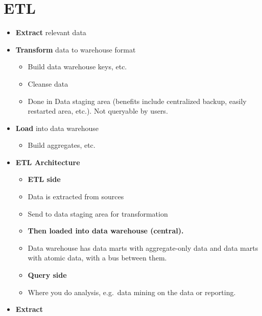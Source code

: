 
\section{ETL}
\begin{multicols}{2}
\begin{itemize}
\item
  \textbf{Extract} relevant data
\item
  \textbf{Transform} data to warehouse format

  \begin{itemize}
    \item
    Build data warehouse keys, etc.
  \item
    Cleanse data
  \item
    Done in Data staging area (benefits include centralized backup,
    easily restarted area, etc.). Not queryable by users.
  \end{itemize}
\item
  \textbf{Load} into data warehouse

  \begin{itemize}
    \item
    Build aggregates, etc.
  \end{itemize}
\item
  \textbf{ETL Architecture}

  \begin{itemize}
    \item
    \textbf{ETL side}
  \item
    Data is extracted from sources
  \item
    Send to data staging area for transformation
  \item
    \textbf{Then loaded into data warehouse (central).}
  \item
    Data warehouse has data marts with aggregate-only data and data
    marts with atomic data, with a bus between them.
  \item
    \textbf{Query side}
  \item
    Where you do analysis, e.g.~data mining on the data or reporting.
  \end{itemize}
\item
  \textbf{Extract}


\end{itemize}
\end{multicols}
